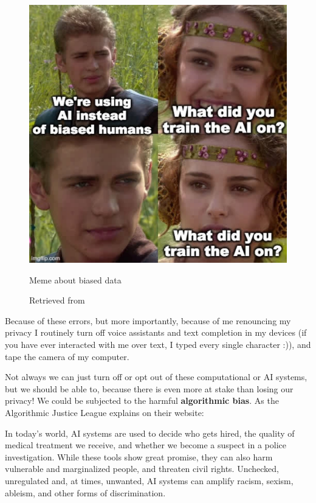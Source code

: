 \begin{figure}[ht]
  \centering
  \includegraphics[width=0.75\linewidth,height=0.25\textheight,keepaspectratio]{images/meme-star-wars.jpg}
  \caption{Meme about biased data}
  \caption*{Retrieved from \cite{website-twitter-janellecshane-meme}}
  \label{fig:meme-star-wars}
\end{figure}

Because of these errors, but more importantly, because of me renouncing my privacy I routinely turn off voice assistants and text completion in my devices (if you have ever interacted with me over text, I typed every single character :)), and tape the camera of my computer.

Not always we can just turn off or opt out of these computational or \acrshort{AI} systems, but we should be able to, because there is even more at stake than losing our privacy! We could be subjected to the harmful \textbf{algorithmic bias}. As the Algorithmic Justice League explains on their website:

\begin{displayquote}
In today’s world, AI systems are used to decide who gets hired, the quality of medical treatment we receive, and whether we become a suspect in a police investigation. While these tools show great promise, they can also harm vulnerable and marginalized people, and threaten civil rights. Unchecked, unregulated and, at times, unwanted, AI systems can amplify racism, sexism, ableism, and other forms of discrimination.\cite{website-algorithmic-justice-league}
\end{displayquote}

